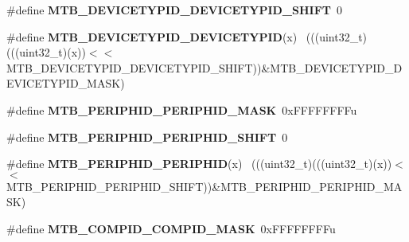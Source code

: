 \begin{DoxyCompactItemize}
\item 
\hypertarget{group___m_t_b___register___masks_ga233d82a0813df4ea2de5bdaf77f49b27}{}\#define {\bfseries M\+T\+B\+\_\+\+D\+E\+V\+I\+C\+E\+T\+Y\+P\+I\+D\+\_\+\+D\+E\+V\+I\+C\+E\+T\+Y\+P\+I\+D\+\_\+\+S\+H\+I\+F\+T}~0\label{group___m_t_b___register___masks_ga233d82a0813df4ea2de5bdaf77f49b27}

\item 
\hypertarget{group___m_t_b___register___masks_gaf3c7430d8eb0bd8a315b1e7c6ff9fe5e}{}\#define {\bfseries M\+T\+B\+\_\+\+D\+E\+V\+I\+C\+E\+T\+Y\+P\+I\+D\+\_\+\+D\+E\+V\+I\+C\+E\+T\+Y\+P\+I\+D}(x)                  ~(((uint32\+\_\+t)(((uint32\+\_\+t)(x))$<$$<$M\+T\+B\+\_\+\+D\+E\+V\+I\+C\+E\+T\+Y\+P\+I\+D\+\_\+\+D\+E\+V\+I\+C\+E\+T\+Y\+P\+I\+D\+\_\+\+S\+H\+I\+F\+T))\&M\+T\+B\+\_\+\+D\+E\+V\+I\+C\+E\+T\+Y\+P\+I\+D\+\_\+\+D\+E\+V\+I\+C\+E\+T\+Y\+P\+I\+D\+\_\+\+M\+A\+S\+K)\label{group___m_t_b___register___masks_gaf3c7430d8eb0bd8a315b1e7c6ff9fe5e}

\item 
\hypertarget{group___m_t_b___register___masks_ga8be09de74be8da3de47e29838b6e7ca8}{}\#define {\bfseries M\+T\+B\+\_\+\+P\+E\+R\+I\+P\+H\+I\+D\+\_\+\+P\+E\+R\+I\+P\+H\+I\+D\+\_\+\+M\+A\+S\+K}~0x\+F\+F\+F\+F\+F\+F\+F\+Fu\label{group___m_t_b___register___masks_ga8be09de74be8da3de47e29838b6e7ca8}

\item 
\hypertarget{group___m_t_b___register___masks_gaf919275fec0a218a929c0b39be8c2929}{}\#define {\bfseries M\+T\+B\+\_\+\+P\+E\+R\+I\+P\+H\+I\+D\+\_\+\+P\+E\+R\+I\+P\+H\+I\+D\+\_\+\+S\+H\+I\+F\+T}~0\label{group___m_t_b___register___masks_gaf919275fec0a218a929c0b39be8c2929}

\item 
\hypertarget{group___m_t_b___register___masks_ga736d772d918662cd3b755b370be167b4}{}\#define {\bfseries M\+T\+B\+\_\+\+P\+E\+R\+I\+P\+H\+I\+D\+\_\+\+P\+E\+R\+I\+P\+H\+I\+D}(x)                              ~(((uint32\+\_\+t)(((uint32\+\_\+t)(x))$<$$<$M\+T\+B\+\_\+\+P\+E\+R\+I\+P\+H\+I\+D\+\_\+\+P\+E\+R\+I\+P\+H\+I\+D\+\_\+\+S\+H\+I\+F\+T))\&M\+T\+B\+\_\+\+P\+E\+R\+I\+P\+H\+I\+D\+\_\+\+P\+E\+R\+I\+P\+H\+I\+D\+\_\+\+M\+A\+S\+K)\label{group___m_t_b___register___masks_ga736d772d918662cd3b755b370be167b4}

\item 
\hypertarget{group___m_t_b___register___masks_ga29964fec46d0063c44f12d25e96d2374}{}\#define {\bfseries M\+T\+B\+\_\+\+C\+O\+M\+P\+I\+D\+\_\+\+C\+O\+M\+P\+I\+D\+\_\+\+M\+A\+S\+K}~0x\+F\+F\+F\+F\+F\+F\+F\+Fu\label{group___m_t_b___register___masks_ga29964fec46d0063c44f12d25e96d2374}


\end{DoxyCompactItemize}
